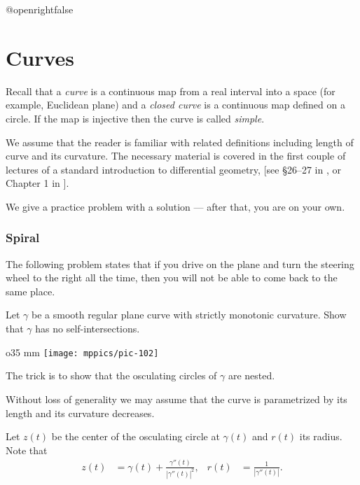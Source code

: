 \csname @openrightfalse\endcsname
\chapter{Curves}

Recall that a \emph{curve} is a continuous map 
from a real interval into a space (for example, Euclidean plane)
and 
a {}\emph{closed curve} is a continuous map defined on a circle.
If the map is injective then the curve is called {}\emph{simple}.

We assume that the reader is familiar with related definitions including 
length of curve 
and its curvature.
The necessary material is covered in the first couple of lectures 
of a standard introduction to differential geometry, [see \S26--27 in , or Chapter 1 in ].

\medskip

We give a practice problem with a solution --- after that, you are on your own.

\subsection*{Spiral}
\label{spiral}

The following problem states that 
if you drive on the plane and turn the steering wheel to the right all the time,
then you will not be able to come back to the same place.

\begin{pr}
Let $\gamma$ be a smooth regular plane curve with strictly monotonic curvature. 
Show that $\gamma$ has no self-intersections.
\end{pr}

\begin{wrapfigure}{o}{35 mm}
\centering
\texttt{[image: mppics/pic-102]}
\end{wrapfigure}

The trick is to show that the osculating circles of $\gamma$ are nested.

\medskip

Without loss of generality we may assume that the curve is parametrized by its length and its
curvature decreases.

Let $z(t)$ be the center of the osculating circle at $\gamma(t)$
and $r(t)$ its radius.
Note that 
\begin{align*}
z(t)&=\gamma(t)+\tfrac{\gamma''(t)}{|\gamma''(t)|^2},
&
r(t)&=\tfrac{1}{|\gamma''(t)|}.
\end{align*}

